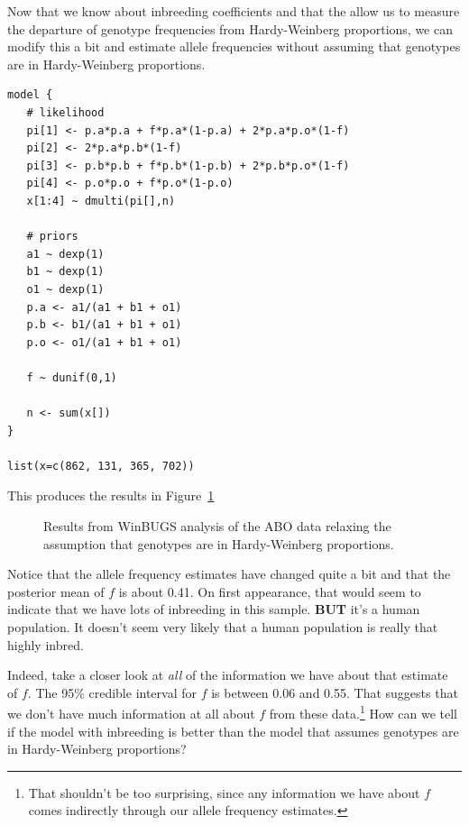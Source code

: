 Now that we know about inbreeding coefficients and that the allow us
to measure the departure of genotype frequencies from Hardy-Weinberg
proportions, we can modify this a bit and estimate allele frequencies
without assuming that genotypes are in Hardy-Weinberg proportions.
\begin{verbatim}
model {
   # likelihood 
   pi[1] <- p.a*p.a + f*p.a*(1-p.a) + 2*p.a*p.o*(1-f)
   pi[2] <- 2*p.a*p.b*(1-f)
   pi[3] <- p.b*p.b + f*p.b*(1-p.b) + 2*p.b*p.o*(1-f)
   pi[4] <- p.o*p.o + f*p.o*(1-p.o)
   x[1:4] ~ dmulti(pi[],n)

   # priors
   a1 ~ dexp(1)
   b1 ~ dexp(1)
   o1 ~ dexp(1)
   p.a <- a1/(a1 + b1 + o1)
   p.b <- b1/(a1 + b1 + o1)
   p.o <- o1/(a1 + b1 + o1)

   f ~ dunif(0,1)

   n <- sum(x[])
}

list(x=c(862, 131, 365, 702))
\end{verbatim}
This produces the results in Figure~\ref{fig:ABO-inbreeding}

\begin{figure}
\caption{Results from WinBUGS analysis of the ABO
  data relaxing the assumption that genotypes are in Hardy-Weinberg proportions.}\label{fig:ABO-inbreeding}
\end{figure}

Notice that the allele frequency estimates have changed quite a bit
and that the posterior mean of $f$ is about 0.41. On first appearance,
that would seem to indicate that we have lots of inbreeding in this
sample. {\bf BUT} it's a human population. It doesn't seem very
likely that a human population is really that highly inbred. 

Indeed, take a closer look at {\it all\/} of the information we have
about that estimate of $f$. The 95\% credible interval for $f$ is
between 0.06 and 0.55. That suggests that we don't have much
information at all about $f$ from these data.\footnote{That shouldn't
  be too surprising, since any information we have about $f$ comes
  indirectly through our allele frequency estimates.} How can we tell
if the model with inbreeding is better than the model that assumes
genotypes are in Hardy-Weinberg proportions?

